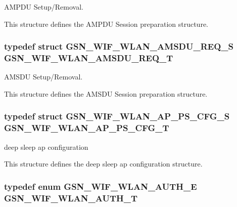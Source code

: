AMPDU Setup/Removal. 

This structure defines the AMPDU Session preparation structure. \hypertarget{a00677_ga3da66319027a0addea57f579e40c55a6}{
\subsubsection[{GSN\_\-WIF\_\-WLAN\_\-AMSDU\_\-REQ\_\-T}]{\setlength{\rightskip}{0pt plus 5cm}typedef struct {\bf GSN\_\-WIF\_\-WLAN\_\-AMSDU\_\-REQ\_\-S}  {\bf GSN\_\-WIF\_\-WLAN\_\-AMSDU\_\-REQ\_\-T}}}
\label{a00677_ga3da66319027a0addea57f579e40c55a6}


AMSDU Setup/Removal. 

This structure defines the AMSDU Session preparation structure. \hypertarget{a00677_ga5b778f6fbad2d264cc6e8d03a61b7a42}{
\subsubsection[{GSN\_\-WIF\_\-WLAN\_\-AP\_\-PS\_\-CFG\_\-T}]{\setlength{\rightskip}{0pt plus 5cm}typedef struct {\bf GSN\_\-WIF\_\-WLAN\_\-AP\_\-PS\_\-CFG\_\-S} {\bf GSN\_\-WIF\_\-WLAN\_\-AP\_\-PS\_\-CFG\_\-T}}}
\label{a00677_ga5b778f6fbad2d264cc6e8d03a61b7a42}


deep sleep ap configuration 

This structure defines the deep sleep ap configuration structure. \hypertarget{a00677_ga07b4b8b059f529183cc5da3aadfa2966}{
\subsubsection[{GSN\_\-WIF\_\-WLAN\_\-AUTH\_\-T}]{\setlength{\rightskip}{0pt plus 5cm}typedef enum {\bf GSN\_\-WIF\_\-WLAN\_\-AUTH\_\-E}  {\bf GSN\_\-WIF\_\-WLAN\_\-AUTH\_\-T}}}
\label{a00677_ga07b4b8b059f529183cc5da3aadfa2966}



